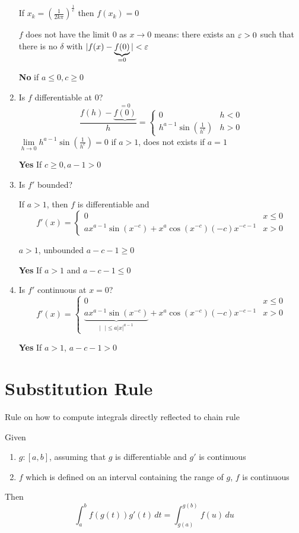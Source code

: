 \begin{example*}
\begin{enumerate}
    If $x_k = \left(\frac{1}{2k\pi}\right)^{\frac{1}{c}}$ then $f(x_k) = 0$

    $f$ does not have the limit $0$ as $x \to 0$ means: there exists an $\varepsilon > 0$ such that there is no $\delta$ with $|f(x) - \underbrace{f(0)}_{=0}| < \varepsilon$

    \textbf{No} if $a \le 0, c \ge 0$
    \item Is $f$ differentiable at $0$?
    \[\frac{f(h) - \underbrace{f(0)}^{= 0}}{h} = \begin{cases}
      0 & h < 0 \\ 
      h^{a-1}\sin\left(\frac{1}{h^c}\right) & h > 0
    \end{cases}\]
    $\lim\limits_{h \to 0} h^{a-1}\sin\left(\frac{1}{h^c}\right) = 0$ if $a > 1$, does not exists if $a = 1$

    \textbf{Yes} If $c \ge 0, a - 1 > 0$
    \item Is $f'$ bounded?

    If $a > 1$, then $f$ is differentiable and 
    \[f'(x) = \begin{cases}
      0 & x \le 0 \\ 
      ax^{a-1}\sin(x^{-c}) + x^a\cos(x^{-c})(-c)x^{-c-1} & x > 0
    \end{cases}\]

    $a > 1$, unbounded $a - c - 1 \ge 0$

    \textbf{Yes} If $a > 1$ and $a - c - 1 \le 0$
    \item Is $f'$ continuous at $x = 0$?
    \[f'(x) = \begin{cases}
      0 & x \le 0 \\ 
      \underbrace{ax^{a-1}\sin(x^{-c})}_{|\text{ }| \le a|x|^{a-1}} + x^a\cos(x^{-c})(-c)x^{-c-1} & x > 0
    \end{cases}\]
    
    \textbf{Yes} If $a > 1$, $a - c - 1 > 0$
  \end{enumerate}
\end{example*}

\section{Substitution Rule}
Rule on how to compute integrals directly reflected to chain rule

\begin{theorem*}
Given 
\begin{enumerate}[-]
  \item $g : [a, b]$, assuming that $g$ is differentiable and $g'$ is continuous 
  \item $f$ which is defined on an interval containing the range of $g$, $f$ is continuous
\end{enumerate}

Then \[\displaystyle\int_a^b f(g(t))g'(t)\,dt = \int_{g(a)}^{g(b)} f(u)\,du\]
\end{theorem*}

